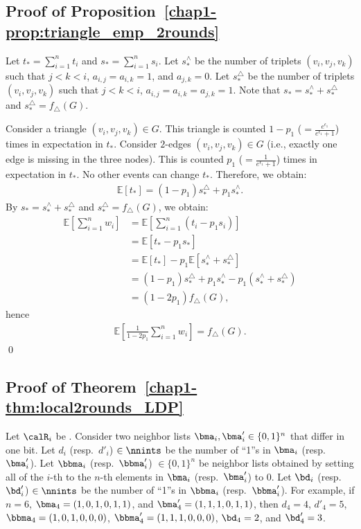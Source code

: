 \subsection{Proof of Proposition~\ref{chap1-prop:triangle_emp_2rounds}}
Let $t_* = \sum_{i=1}^n t_i$ and $s_* = \sum_{i=1}^n s_i$. 
Let $s_*^{\wedge}$ be the number of triplets $(v_i,v_j,v_k)$ such that $j<k<i$, $a_{i,j} = a_{i,k} = 1$, and $a_{j,k} = 0$. 
Let $s_*^{\triangle}$ be the number of triplets $(v_i,v_j,v_k)$ such that $j<k<i$, $a_{i,j} = a_{i,k} = a_{j,k} =1$. 
Note that 
$s_* = s_*^{\wedge} + s_*^{\triangle}$ and 
$s_*^{\triangle} = f_\triangle(G)$. 

Consider a triangle $(v_i,v_j,v_k) \in G$. 
This triangle is counted $1-p_1$ ($= \frac{e^{\epsilon_1}}{e^{\epsilon_1}+1}$) times in expectation in $t_*$. 
Consider $2$-edges $(v_i,v_j,v_k) \in G$ (i.e., exactly one edge is missing in the three nodes). 
This is counted $p_1$ ($= \frac{1}{e^{\epsilon_1}+1}$) times in expectation in $t_*$.  
No other events can change $t_*$. 
Therefore, we obtain:
\begin{align*}
\mathbb{E}[t_*] = (1-p_1) s_*^{\triangle} + p_1 s_*^{\wedge}. 
\end{align*}
By $s_* = s_*^{\wedge} + s_*^{\triangle}$ and 
$s_*^{\triangle} = f_\triangle(G)$, we obtain:
\begin{align*}
\mathbb{E}\left[\sum_{i=1}^n w_i \right] 
&= \mathbb{E}\left[\sum_{i=1}^n (t_i - p_1 s_i) \right] \\
&= \mathbb{E}[t_* - p_1 s_*] \\
&= \mathbb{E}[t_*] - p_1 \mathbb{E}[s_*^{\wedge} + s_*^{\triangle}] \\
&= (1-p_1) s_*^{\triangle} + p_1 s_*^{\wedge} - p_1 (s_*^{\wedge} + s_*^{\triangle}) \\
&= (1 - 2 p_1) f_\triangle(G),
\end{align*}
hence 
\begin{align*}
\textstyle{\mathbb{E}\left[ \frac{1}{1-2p_1} \sum_{i=1}^n w_i \right] = f_\triangle(G).}
\end{align*}
\qed

\subsection{Proof of Theorem~\ref{chap1-thm:local2rounds_LDP}}
Let $\calR_i$ be . 
Consider two neighbor lists $\bma_i,\bma'_i \in \{0,1\}^n$ that differ in one bit. 
Let $d_i$ (resp.~$d'_i$) $\in \nnints$ be the number of ``1''s in $\bma_i$ (resp.~$\bma'_i$). 
Let $\bbma_i$ (resp.~$\bbma'_i$) $\in \{0,1\}^n$ be neighbor lists obtained by setting all of the $i$-th to the $n$-th elements in $\bma_i$ (resp.~$\bma'_i$) to $0$. 
Let $\bd_i$ (resp.~$\bd'_i$) $\in \nnints$ be the number of ``1''s in $\bbma_i$ (resp.~$\bbma'_i$). 
For example, if $n=6$, $\bma_4=(1,0,1,0,1,1)$, and $\bma'_4=(1,1,1,0,1,1)$, then 
$d_4=4$, $d'_4=5$, $\bbma_4=(1,0,1,0,0,0)$, $\bbma'_4=(1,1,1,0,0,0)$, $\bd_4=2$, and $\bd'_4=3$. 

